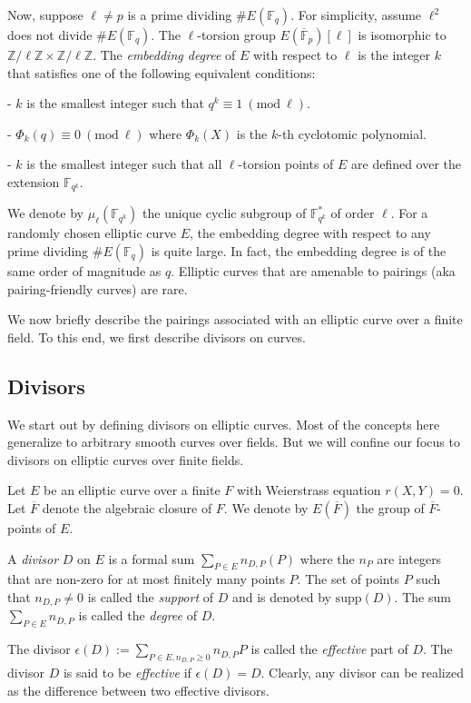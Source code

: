 \documentclass[11pt, lettersize, notitlepage, leqno, footskip=0.6cm]{article}
\newcommand{\bF}{\mathbb F}
\newcommand{\bz}{\mathbb Z}
\newcommand{\bFP}{\ov{\mathbb{F}}_p}
\newcommand{\bFq}{\mathbb{F}_q}
\newcommand{\bFqk}{\mathbb{F}_{q^k}}
\newcommand{\slim}{\sum\limits}
\newcommand{\mr}{\mathrm}
\newcommand{\ov}{\overline}
\newcommand{\noin}{\noindent}
\newcommand{\Mod}[1]{\ (\mathrm{mod}\ #1)}
\numberwithin{equation}{section}
\begin{document}
Now, suppose $\ell\neq p$ is a prime dividing $\# E(\bFq)$. For simplicity, assume $\ell^2$ does not divide $\# E(\bFq)$. The $\ell$-torsion group $E(\bFP)[\ell]$ is isomorphic to $\bz/\ell\bz \times \bz/\ell\bz$. The \textit{embedding degree} of $E$ with respect to $\ell$ is the integer $k$ that satisfies one of the following equivalent conditions: 

\noin - $k$ is the smallest integer such that $q^k\equiv 1\Mod{\ell}$.

\noin - $\Phi_k(q)\equiv 0\Mod{\ell}$ where $\Phi_k(X)$ is the $k$-th cyclotomic polynomial.

\noin - $k$ is the smallest integer such that all $\ell$-torsion points of $E$ are defined over the extension $\bFqk$.


We denote by $\mu_{\ell}(\bF _{q^k})$ the unique cyclic subgroup of $\bF _{q^k}^*$ of order $\ell$. For a randomly chosen elliptic curve $E$, the embedding degree with respect to any prime dividing $\# E(\bFq)$ is quite large. In fact, the embedding degree is of the same order of magnitude as $q$. Elliptic curves that are amenable to pairings (aka pairing-friendly curves) are rare.

We now briefly describe the pairings associated with an elliptic curve over a finite field. To this end, we first describe divisors on curves.\\ 

\subsection{\fontsize{11}{11}\selectfont Divisors}

We start out by defining divisors on elliptic curves. Most of the concepts here generalize to arbitrary smooth curves over fields. But we will confine our focus to divisors on elliptic curves over finite fields.

Let $E$ be an elliptic curve over a finite $F$ with Weierstrass equation $r(X,Y) = 0$. Let $\ov{F}$ denote the algebraic closure of $F$. We denote by $E(\ov{F})$ the group of $\ov{F}$-points of $E$. 

A \textit{divisor} $D$ on $E$ is a formal sum $\slim_{P\in E}n_{D,P}(P) $ where the $n_P$ are integers that are non-zero for at most finitely many points $P$. The set of points $P$ such that $n_{D,P}\neq 0$ is called the \textit{support} of $D$ and is denoted by $\mr{supp}(D)$. The sum $\slim_{P\in E}n_{D,P}$ is called the \textit{degree} of $D$. 

The divisor $\epsilon(D):= \slim_{P\in E, n_{D,P}\geq 0} n_{D,P}P $ is called the \textit{effective} part of $D$. The divisor $D$ is said to be \textit{effective} if $\epsilon(D) = D$. Clearly, any divisor can be realized as the difference between two effective divisors.
\end{document}
